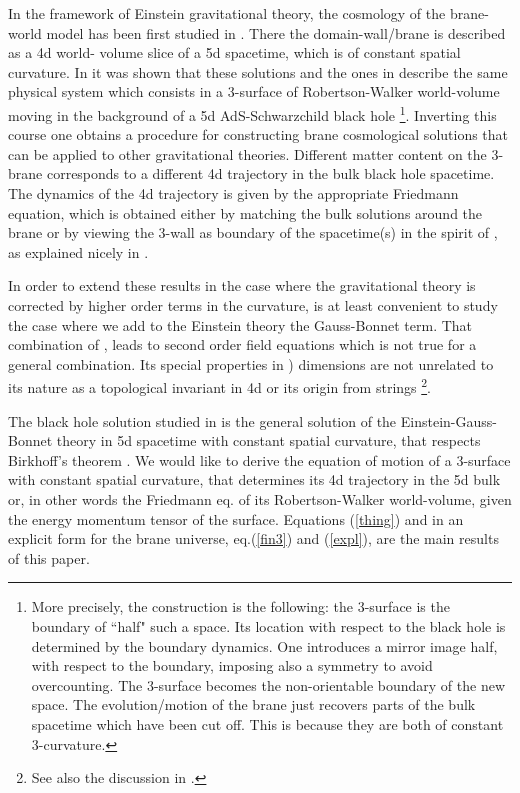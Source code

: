 \documentclass[a4paper,a4paper]{article}
\begin{document}
In the framework of Einstein gravitational theory, the cosmology of the brane-world model
has been first studied in \coordHE{}. There the domain-wall/brane 
 is described as a 4d world-
volume slice of a 5d spacetime, which is of constant spatial curvature.  In \cite{Mukohyama:1999wi}
it was shown that these solutions and the ones in \coordHE{} 
 describe the same physical system which consists in a 3-surface 
of Robertson-Walker world-volume moving in the background of a 5d AdS-Schwarzchild black hole
\footnote{More precisely, the construction is the following:
 the 3-surface is the boundary of ``half" such a space. Its location
with respect to the black hole is determined by the boundary dynamics.
One introduces a mirror image half, with respect to the
boundary, imposing also a \coordHE{} symmetry to avoid overcounting. The 3-surface
becomes the non-orientable boundary of the new space. The evolution/motion of
the brane just
 recovers parts of the bulk spacetime which have
been cut off. This is because they are both of constant 3-curvature.}. Inverting 
this course one obtains a procedure 
for constructing brane cosmological solutions
that can be applied to
other gravitational theories.  Different
matter content on the 3-brane corresponds to a different 4d trajectory in the bulk black hole spacetime.
The dynamics of the 4d trajectory is given by the appropriate Friedmann equation, which
is obtained either by matching the bulk solutions around the brane or by viewing the
3-wall as boundary of the spacetime(s) in the spirit of \coordHE{}, as explained
nicely in \coordHE{}.

In order to extend these results in the case where 
the gravitational theory is corrected by  higher order terms in the curvature, 
is at least convenient to
study the case where we add to the Einstein theory the Gauss-Bonnet term. That combination
of  \coordHE{},
 leads to second order 
field equations which is not true for a general 
combination. Its special properties in \coordHE{}) dimensions
are not unrelated to its nature as a topological invariant in 
4d \coordHE{} or its origin from strings \coordHE{} 
\footnote{See also the discussion in \coordHE{}.}.

The black hole solution studied in \coordHE{} is the general solution
of the Einstein-Gauss-Bonnet theory in 5d spacetime with constant spatial curvature,
that respects Birkhoff's theorem \coordHE{}. We would like to derive
the equation of motion of a 3-surface with constant spatial curvature, that determines
its 4d trajectory in the 5d bulk or, in other words the Friedmann eq. of its Robertson-Walker
world-volume, given the energy momentum tensor \coordHE{} of the surface. Equations
(\ref{thing}) and in an explicit form for the brane universe, eq.(\ref{fin3}) and
(\ref{expl}), are the main
results of this paper.
\end{document}
